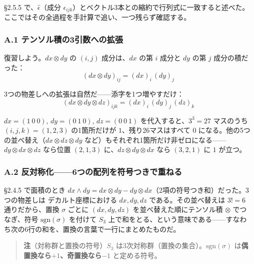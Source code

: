 \documentclass[a4paper,12pt,openany]{book}
\begin{document}
§2.5.5 で、\(\widehat{\epsilon}\)（成分
\(\epsilon_{ijk}\)）とベクトル3本との縮約で行列式に一致すると述べた。ここではその全過程を手計算で追い、一つ残らず確認する。

\hypertarget{a.1-ux30c6ux30f3ux30bdux30ebux7a4dux306e3ux5f15ux6570ux3078ux306eux62e1ux5f35}{%
\subsubsection*{A.1
テンソル積の3引数への拡張}\label{a.1-ux30c6ux30f3ux30bdux30ebux7a4dux306e3ux5f15ux6570ux3078ux306eux62e1ux5f35}}

復習しよう。\(dx \otimes dy\) の \((i,j)\) 成分は、\(dx\) の第 \(i\)
成分と \(dy\) の第 \(j\) 成分の積だった：
\[(dx \otimes dy)_{ij} = (dx)_i\,(dy)_j\]

3つの物差しへの拡張は自然だ——添字を1つ増やすだけ：
\[(dx \otimes dy \otimes dz)_{ijk} = (dx)_i\,(dy)_j\,(dz)_k\]

\(dx = (1\ 0\ 0)\), \(dy = (0\ 1\ 0)\), \(dz = (0\ 0\ 1)\)
を代入すると、\(3^3 = 27\) マスのうち \((i,j,k) = (1,2,3)\)
の1箇所だけが \(1\)、残り26マスはすべて \(0\)
になる。他の5つの並べ替え（\(dx \otimes dz \otimes dy\)
など）もそれぞれ1箇所だけ非ゼロになる——\(dy \otimes dx \otimes dz\)
なら位置 \((2,1,3)\) に、\(dz \otimes dy \otimes dx\) なら \((3,2,1)\)
に \(1\) が立つ。

\hypertarget{a.2-ux53cdux5bfeux79f0ux53166ux3064ux306eux914dux5217ux3092ux7b26ux53f7ux3064ux304dux3067ux91cdux306dux308b}{%
\subsubsection*{A.2
反対称化——6つの配列を符号つきで重ねる}\label{a.2-ux53cdux5bfeux79f0ux53166ux3064ux306eux914dux5217ux3092ux7b26ux53f7ux3064ux304dux3067ux91cdux306dux308b}}

§2.4.5 で面積のとき
\(dx \wedge dy = dx \otimes dy - dy \otimes dx\)（2項の符号つき和）だった。3つの物差しは
デカルト座標における \(dx, dy, dz\) である。その並べ替えは \(3! = 6\)
通りだから、置換 \(\sigma\) ごとに \((dx,dy,dz)\)
を並べ替えた順にテンソル積 \(\otimes\) でつなぎ、符号
\(\mathrm{sgn}(\sigma)\) を付けて \(S_3\)
上で和をとる、という意味である——すなわち次の6行の和を、置換の言葉で一行にまとめたものだ。

\begin{quote}
\textbf{注}（対称群と置換の符号）\(S_3\)
は3次対称群（置換の集合）。\(\mathrm{sgn}(\sigma)\)
は\textbf{偶置換なら}\(+1\)\textbf{、奇置換なら}\(-1\) と定める符号。
\end{quote}
\end{document}
